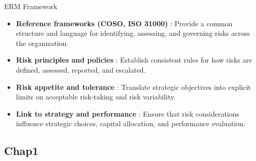 \documentclass[aspectratio=169, 10pt]{beamer} %
\begin{document}
\begin{frame}{ERM Framework}

\begin{itemize}
    \item[$\bullet$]\textbf{Reference frameworks (COSO, ISO 31000)} :
    Provide a common structure and language for identifying, assessing, and
    governing risks across the organization.
\medskip
    \item[$\bullet$] \textbf{Risk principles and policies} :
    Establish consistent rules for how risks are defined, assessed, reported,
    and escalated.
\medskip

    \item[$\bullet$] \textbf{Risk appetite and tolerance} :
    Translate strategic objectives into explicit limits on acceptable risk-taking
    and risk variability.
\medskip

    \item[$\bullet$] \textbf{Link to strategy and performance} :
    Ensure that risk considerations influence strategic choices, capital
    allocation, and performance evaluation.
\end{itemize}

\end{frame}

\subsection{Chap1}
\end{document}

